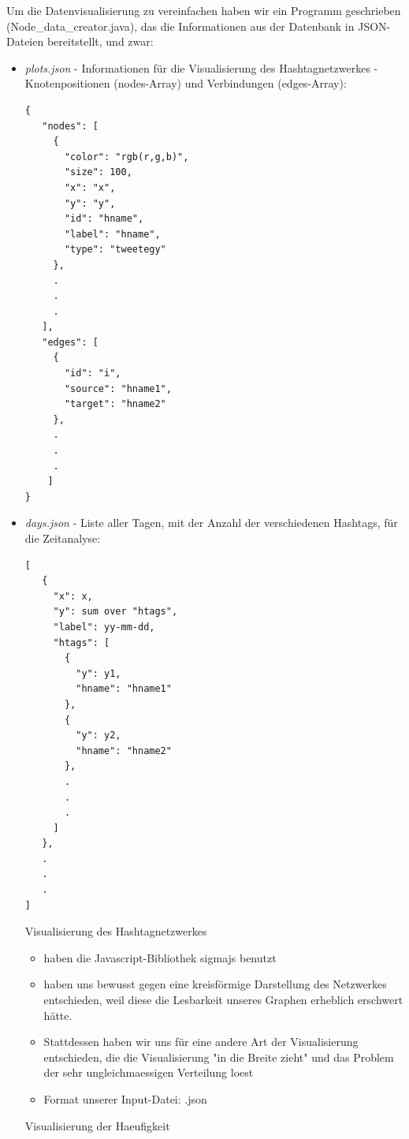 \documentclass[paper=a4, english, ngerman, romanian]{scrartcl}
\begin{document}
		Um die Datenvisualisierung zu vereinfachen haben wir ein Programm geschrieben (Node\_data\_creator.java), das die Informationen aus der Datenbank in JSON-Dateien bereitstellt, und zwar:
			\begin{itemize}
				\item	\textit{plots.json} - Informationen für die Visualisierung des Hashtagnetzwerkes - Knotenpositionen (nodes-Array) und Verbindungen (edges-Array):
				\begin{lstlisting}
{
   "nodes": [
     {
       "color": "rgb(r,g,b)",
       "size": 100,
       "x": "x",
       "y": "y",
       "id": "hname",
       "label": "hname",
       "type": "tweetegy"
     },
     .
     .
     .
   ],
   "edges": [
     {
       "id": "i",
       "source": "hname1",
       "target": "hname2"
     },
     .
     .
     .
    ]
}
				\end{lstlisting}
				
				\item \textit{days.json} - Liste aller Tagen, mit der Anzahl der verschiedenen Hashtags, für die Zeitanalyse:
				
				\begin{lstlisting}
[
   {
     "x": x,
     "y": sum over "htags",
     "label": yy-mm-dd,
     "htags": [
       {
         "y": y1,
         "hname": "hname1"
       },
       {
         "y": y2,
         "hname": "hname2"
       },
       .
       .
       .
     ]
   },
   .
   .
   .
]
				\end{lstlisting}
\newpage
Visualisierung des Hashtagnetzwerkes 

\begin{itemize}
\item haben die Javascript-Bibliothek sigmajs benutzt
\item haben uns bewusst gegen eine kreisförmige Darstellung des Netzwerkes entschieden, weil diese die Lesbarkeit unseres Graphen erheblich erschwert hätte.
\item Stattdessen haben wir uns für eine andere Art der Visualisierung entschieden, die die Visualisierung "in die Breite zieht" und das Problem der sehr ungleichmaessigen Verteilung loest
\item Format unserer Input-Datei: .json
\\
\end{itemize}

Visualisierung der Haeufigkeit 


\end{itemize}
\end{document}
